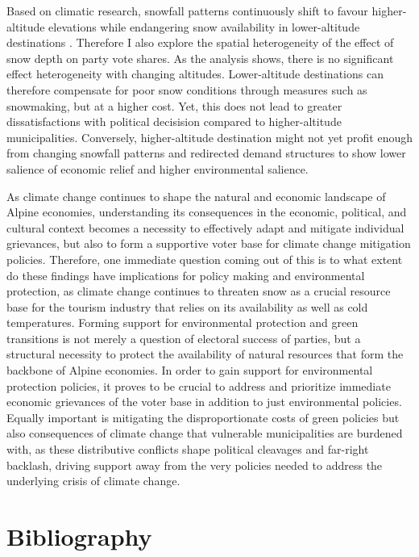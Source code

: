 \documentclass{article}
\begin{document}
Based on climatic research, snowfall patterns continuously shift to favour higher-altitude elevations while endangering snow availability in lower-altitude destinations \parencite{li2025, Olefs2020}. Therefore I also explore the spatial heterogeneity of the effect of snow depth on party vote shares. As the analysis shows, there is no significant effect heterogeneity with changing altitudes. Lower-altitude destinations can therefore compensate for poor snow conditions through measures such as snowmaking, but at a higher cost. Yet, this does not lead to greater dissatisfactions with political decisision compared to higher-altitude municipalities. Conversely, higher-altitude destination might not yet profit enough from changing snowfall patterns and redirected demand structures to show lower salience of economic relief and higher environmental salience. 

As climate change continues to shape the natural and economic landscape of Alpine economies, understanding its consequences in the economic, political, and cultural context becomes a necessity to effectively adapt and mitigate individual grievances, but also to form a supportive voter base for climate change mitigation policies. Therefore, one immediate question coming out of this is to what extent do these findings have implications for policy making and environmental protection, as climate change continues to threaten snow as a crucial resource base for the tourism industry that relies on its availability as well as cold temperatures. Forming support for environmental protection and green transitions is not merely a question of electoral success of parties, but a structural necessity to protect the availability of natural resources that form the backbone of Alpine economies. In order to gain support for environmental protection policies, it proves to be crucial to address and prioritize immediate economic grievances of the voter base in addition to just environmental policies. Equally important is mitigating the disproportionate costs of green policies but also consequences of  climate change that vulnerable municipalities are burdened with, as these distributive conflicts shape political cleavages and far-right backlash, driving support away from the very policies needed to address the underlying crisis of climate change. 

\newpage

\section*{Bibliography}
\printbibliography[heading=none]
\end{document}

